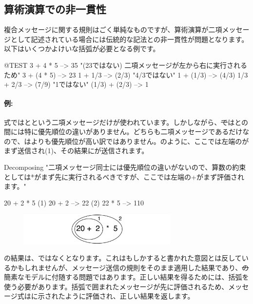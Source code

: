 \documentclass[a4paper,10pt,twoside]{book}
\begin{document}
\subsection{算術演算での非一貫性}
複合メッセージに関する規則はごく単純なものですが、算術演算が二項メッセージとして記述されている場合には伝統的な記法との非一貫性が問題となります。以下はいくつかよけいな括弧が必要となる例です。

\begin{code}{@TEST}
3 + 4 * 5      --> 35    "(23ではない)  二項メッセージが左から右に実行されるため"
3 + (4 * 5)    --> 23
1 + 1/3         --> (2/3)    "4/3ではない"
1 + (1/3)       --> (4/3)
1/3 + 2/3       --> (7/9)    "1ではない"
(1/3) + (2/3)  --> 1
\end{code}

\paragraph{例:}
式では\ct{+}と\ct{*}という二項メッセージだけが使われています。しかしながら、\st では\ct{+}と\ct{*}の間には特に優先順位の違いがありません。どちらも二項メッセージであるだけなので、\ct{*}は\ct{+}よりも優先順位が高い訳ではありません。のように、ここでは左端の\ct{+}がまず送信され(1)、その結果に\ct{*}が送信されます。

\begin{example}[binaryMessages1]{Decomposing }{}
"二項メッセージ同士には優先順位の違いがないので、算数の約束としては*がまず先に実行されるべきですが、ここでは左端の+がまず評価されます。"

      20 + 2 * 5 
(1)  20 + 2 --> 22
(2)  22       * 5 --> 110
\end{example}

\begin{figure}
\begin{center}\includegraphics[width=8cm]{ucompoNoBracketPar}\end{center}
\end{figure}
\noindent
{}の結果は、ではなくとなります。これはもしかすると書かれた意図とは反しているかもしれませんが、メッセージ送信の規則をそのまま適用した結果であり、\st の簡素なモデルに付随する問題ではあります。正しい結果を得るためには、括弧を使う必要があります。括弧で囲まれたメッセージが先に評価されるため、メッセージ式はに示されたように評価され、正しい結果を返します。
\end{document}
